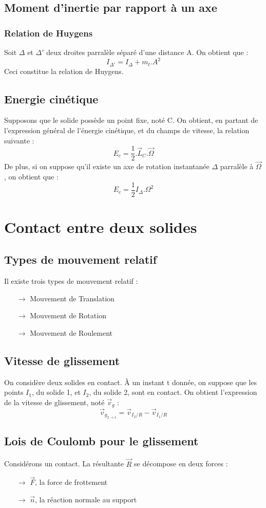 \subsection{Moment d'inertie par rapport à un axe}
\subsubsection{Relation de Huygens}
Soit $\Delta$ et $\Delta'$ deux droites parralèle séparé d'une distance A. On obtient que :
$$I_{\Delta'} = I_{\Delta} + m_t.A^2$$
Ceci constitue la relation de Huygens.
\subsection{Energie cinétique}
Supposons que le solide possède un point fixe, noté C. On obtient, en partant de l'expression général de l'énergie cinétique, et du champs de vitesse, la relation suivante : 
$$E_c = \dfrac{1}{2}.\overrightarrow{L}_C.\overrightarrow{\Omega}$$
De plus, si on suppose qu'il existe un axe de rotation instantanée $\Delta$ parralèle à $\overrightarrow{\Omega}$, on obtient que :
$$E_c = \dfrac{1}{2}I_{\Delta}.\Omega^2$$
\section{Contact entre deux solides}
\subsection{Types de mouvement relatif}
Il existe trois types de mouvement relatif : 
\begin{itemize}
 \item[$\rightarrow$] Mouvement de Translation
 \item[$\rightarrow$] Mouvement de Rotation
 \item[$\rightarrow$] Mouvement de Roulement
\end{itemize}
\subsection{Vitesse de glissement}
On considère deux solides en contact. À un instant t donnée, on suppose que les points $I_1$, du solide 1, et $I_2$, du solide 2, sont en contact. On obtient l'expression de la vitesse de glissement, noté $\overrightarrow{v}_g$ : 
$$\overrightarrow{v}_{g_{2\rightarrow 1}} = \overrightarrow{v}_{I_2/R} - \overrightarrow{v}_{I_1/R}$$
\subsection{Lois de Coulomb pour le glissement}
Considérons un contact. La résultante $\overrightarrow{R}$ se décompose en deux forces : 
\begin{itemize}
 \item[$\rightarrow$] $\overrightarrow{F}$, la force de frottement
 \item[$\rightarrow$] $\overrightarrow{n}$, la réaction normale au support
\end{itemize}
